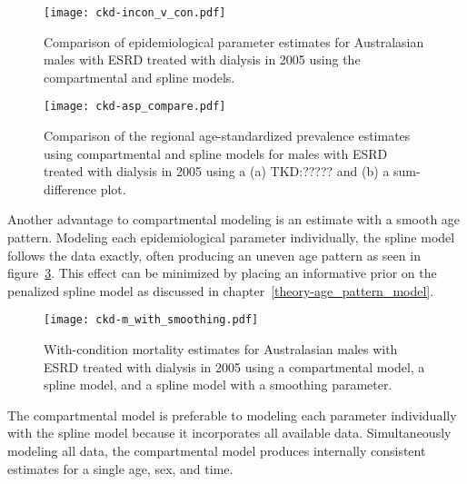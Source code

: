     \begin{figure}[h]
        \begin{center}
            \texttt{[image: ckd-incon\_v\_con.pdf]}
            \caption[Comparison of epidemiological parameter estimates for
              end-stage renal disease treated with dialysis using the compartmental and spline models.]{Comparison of epidemiological parameter estimates
              for Australasian males with ESRD treated with dialysis
              in 2005 using the compartmental and spline models.}
            \label{fig:app-CKD incon v con}
        \end{center}
    \end{figure}

    \begin{figure}[h]
        \begin{center}
            \texttt{[image: ckd-asp\_compare.pdf]}
            \caption[Comparison of the regional age-standardized
              prevalence estimates using compartmental and spline
              models for end-stage renal disease treated with dialysis.]
              {Comparison of the regional age-standardized
              prevalence estimates using compartmental and spline
              models for males with ESRD treated with dialysis in
              2005 using a (a) TKD:????? and (b) a sum-difference plot.}
            \label{fig:app-CKD asp}
        \end{center}
    \end{figure}

Another advantage to compartmental modeling is an estimate with a smooth
age pattern. Modeling each epidemiological parameter individually, the
spline model follows the data exactly, often producing an
uneven age pattern as seen in figure~\ref{fig:app-CKD smooth}.  This
effect can be minimized by placing an informative prior on the
penalized spline model as discussed in chapter~\ref{theory-age_pattern_model}.

    \begin{figure}[h]
        \begin{center}
            \texttt{[image: ckd-m\_with\_smoothing.pdf]}
            \caption[Comparison of with-condition mortality estimates
              for end-stage renal disease treated with dialysis using
              a compartmental model, a spline model, and a spline model
              with a smoothing parameter.]{With-condition mortality estimates for
              Australasian males with ESRD treated with dialysis in
              2005 using a compartmental model, a spline model,
              and a spline model with a smoothing parameter.}
            \label{fig:app-CKD smooth}
        \end{center}
    \end{figure}

The compartmental model is preferable to modeling each parameter
individually with the spline model because it incorporates all
available data.  Simultaneously modeling all data, the compartmental
model produces internally consistent estimates for a single age,
sex, and time.
